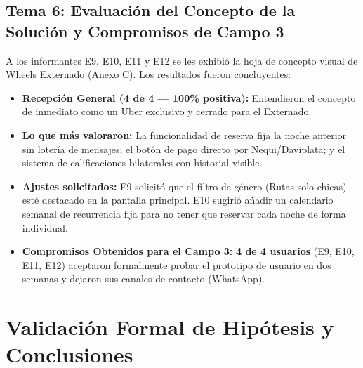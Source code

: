 \documentclass[11pt,a4paper]{article}
\begin{document}
\subsection{Tema 6: Evaluaci\'on del Concepto de la Soluci\'on y Compromisos de Campo 3}
A los informantes E9, E10, E11 y E12 se les exhibi\'o la hoja de concepto visual de Wheels Externado (Anexo C). Los resultados fueron concluyentes:
\begin{itemize}[leftmargin=*]
    \item \textbf{Recepci\'on General (4 de 4 --- 100\% positiva):} Entendieron el concepto de inmediato como un \guillemotleft Uber exclusivo y cerrado para el Externado\guillemotright.
    \item \textbf{Lo que m\'as valoraron:} La funcionalidad de reserva fija la noche anterior sin loter\'ia de mensajes; el bot\'on de pago directo por Nequi/Daviplata; y el sistema de calificaciones bilaterales con historial visible.
    \item \textbf{Ajustes solicitados:} E9 solicit\'o que el filtro de g\'enero (\guillemotleft Rutas solo chicas\guillemotright) est\'e destacado en la pantalla principal. E10 sugiri\'o a\~nadir un calendario semanal de recurrencia fija para no tener que reservar cada noche de forma individual.
    \item \textbf{Compromisos Obtenidos para el Campo 3:} \textbf{4 de 4 usuarios} (E9, E10, E11, E12) aceptaron formalmente probar el prototipo de usuario en dos semanas y dejaron sus canales de contacto (WhatsApp).
\end{itemize}

\section{Validaci\'on Formal de Hip\'otesis y Conclusiones}
\end{document}
